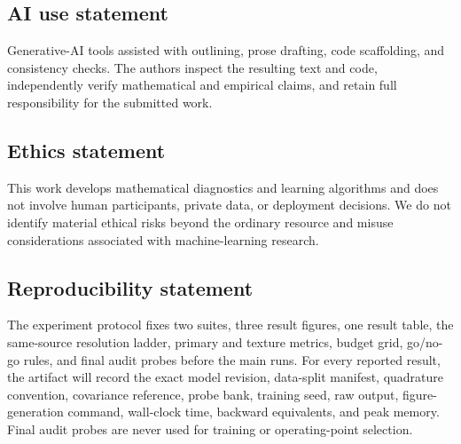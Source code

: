 \subsection*{AI use statement}

Generative-AI tools assisted with outlining, prose drafting, code scaffolding,
and consistency checks. The authors inspect the resulting text and code,
independently verify mathematical and empirical claims, and retain full
responsibility for the submitted work.

\subsection*{Ethics statement}

This work develops mathematical diagnostics and learning algorithms and does
not involve human participants, private data, or deployment decisions. We do
not identify material ethical risks beyond the ordinary resource and misuse
considerations associated with machine-learning research.

\subsection*{Reproducibility statement}

The experiment protocol fixes two suites, three result figures, one result
table, the same-source resolution ladder, primary and texture metrics, budget
grid, go/no-go rules, and final audit probes before the main runs. For every
reported result, the artifact will record the exact model revision, data-split
manifest, quadrature convention, covariance reference, probe bank, training
seed, raw output, figure-generation command, wall-clock time, backward
equivalents, and peak memory. Final audit probes are never used for training or
operating-point selection.
